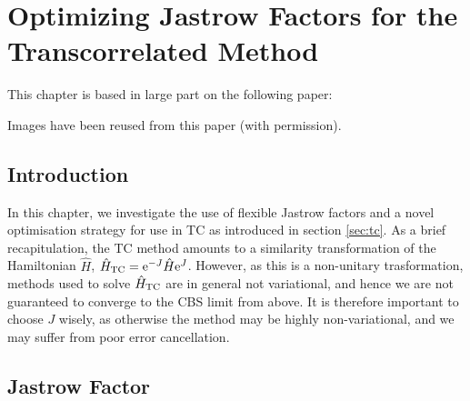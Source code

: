 \chapter{Optimizing Jastrow Factors for the Transcorrelated Method}
  \label{chap:opt}

This chapter is based in large part on the following paper:\\

Images have been reused from this paper (with permission).

\section{Introduction}

In this chapter, we investigate the use of flexible Jastrow factors and a novel optimisation strategy for use in \gls{TC} as introduced in section \ref{sec:tc}. As a brief recapitulation, the TC method amounts to a similarity transformation of the Hamiltonian $\hat H$, $\hat H_\mathrm{TC} = \mathrm{e}^{-J}\hat H\mathrm{e}^J$. However, as this is a non-unitary trasformation, methods used to solve $\hat H_\mathrm{TC}$ are in general not variational, and hence we are not guaranteed to converge to the \gls{CBS} limit from above. It is therefore important to choose $J$ wisely, as otherwise the method may be highly non-variational, and we may suffer from poor error cancellation.


\section{Jastrow Factor}

